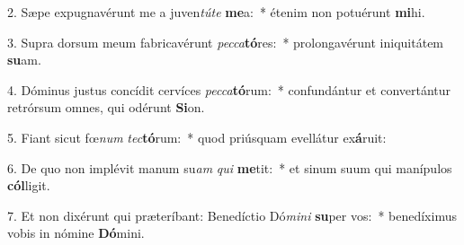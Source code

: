 2. Sæpe expugnavérunt me a juven\textit{tú}\textit{te} \textbf{me}a:~*  étenim non potuérunt \textbf{mi}hi.\

3. Supra dorsum meum fabricavérunt \textit{pec}\textit{ca}\textbf{tó}res:~*  prolongavérunt iniquitátem \textbf{su}am.\

4. Dóminus justus concídit cervíces \textit{pec}\textit{ca}\textbf{tó}rum:~*  confundántur et convertántur retrórsum omnes, qui odérunt \textbf{Si}on.\

5. Fiant sicut fœ\textit{num} \textit{tec}\textbf{tó}rum:~*  quod priúsquam evellátur ex\textbf{á}ruit:\

6. De quo non implévit manum su\textit{am} \textit{qui} \textbf{me}tit:~*  et sinum suum qui manípulos \textbf{cól}ligit.\

7. Et non dixérunt qui præteríbant: Benedíctio Dó\textit{mi}\textit{ni} \textbf{su}per vos:~*  benedíximus vobis in nómine \textbf{Dó}mini.\

